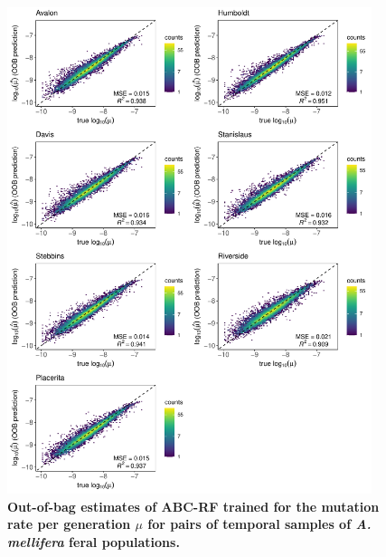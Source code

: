 \documentclass[a4paper, 12pt]{article}
\begin{document}
\begin{figure}[ht]
  \centering
  \includegraphics[width=0.95\textwidth]{Figures/FigureS23_combined_plot_mu.pdf}
  \small\caption{\textbf{Out-of-bag estimates of ABC-RF trained for the mutation rate per generation $\mu$ for pairs of temporal samples of \textit{A. mellifera} feral populations.}}
  \label{fig:supple_feralbee_mu}
\end{figure}
\end{document}
